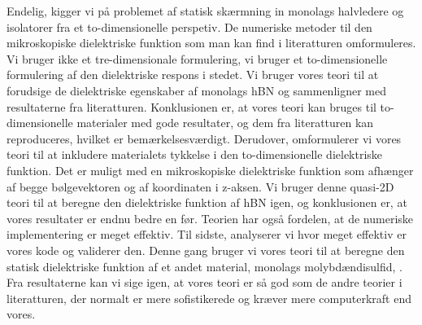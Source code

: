 Endelig, kigger vi på problemet af statisk skærmning in monolags halvledere og isolatorer fra et to-dimensionelle perspetiv.
De numeriske metoder til den mikroskopiske dielektriske funktion som man kan find i literatturen omformuleres.
Vi bruger ikke et tre-dimensionale formulering, vi bruger et to-dimensionelle formulering af den dielektriske respons i stedet.
Vi bruger vores teori til at forudsige de dielektriske egenskaber af monolags hBN og sammenligner med resultaterne fra literatturen.
Konklusionen er, at vores teori kan bruges til to-dimensionelle materialer med gode resultater, og dem fra literatturen kan reproduceres, hvilket er bemærkelsesværdigt.
Derudover, omformulerer vi vores teori til at inkludere materialets tykkelse i den to-dimensionelle dielektriske funktion.
Det er muligt med en mikroskopiske dielektriske funktion som afhænger af begge bølgevektoren og af koordinaten i z-aksen.
Vi bruger denne quasi-2D teori til at beregne den dielektriske funktion af hBN igen, og konklusionen er, at vores resultater er endnu bedre en før.
Teorien har også fordelen, at de numeriske implementering er meget effektiv.
Til sidste, analyserer vi hvor meget effektiv er vores kode og validerer den.
Denne gang bruger vi vores teori til at beregne den statisk dielektriske funktion af et andet material, monolags molybdændisulfid, .
Fra resultaterne kan vi sige igen, at vores teori er så god som de andre teorier i literatturen, der normalt er mere sofistikerede og kræver mere computerkraft end vores.
